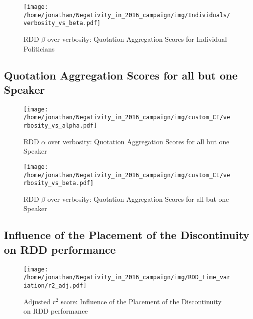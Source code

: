 \begin{figure}[h]\centering
	\texttt{[image: /home/jonathan/Negativity\_in\_2016\_campaign/img/Individuals/verbosity\_vs\_beta.pdf]}
	\caption{RDD $\beta$ over verbosity: Quotation Aggregation Scores for Individual Politicians}
	\label{fig: individuals_RDD beta over verbosity}
\end{figure}

\clearpage
\pagebreak

\subsection{Quotation Aggregation Scores for all but one Speaker}

\begin{figure}[h]\centering
	\texttt{[image: /home/jonathan/Negativity\_in\_2016\_campaign/img/custom\_CI/verbosity\_vs\_alpha.pdf]}
	\caption{RDD $\alpha$ over verbosity: Quotation Aggregation Scores for all but one Speaker}
	\label{fig: ablation_RDD alpha over verbosity}
\end{figure}

\begin{figure}[h]\centering
	\texttt{[image: /home/jonathan/Negativity\_in\_2016\_campaign/img/custom\_CI/verbosity\_vs\_beta.pdf]}
	\caption{RDD $\beta$ over verbosity: Quotation Aggregation Scores for all but one Speaker}
	\label{fig: ablation_RDD beta over verbosity}
\end{figure}

\clearpage
\pagebreak

\subsection{Influence of the Placement of the Discontinuity on RDD performance}

\begin{figure}[h]\centering
	\texttt{[image: /home/jonathan/Negativity\_in\_2016\_campaign/img/RDD\_time\_variation/r2\_adj.pdf]}
	\caption{Adjusted $r^2$ score: Influence of the Placement of the Discontinuity on RDD performance}
	\label{fig: rddtv_Adjusted r^2 score}
\end{figure}

\clearpage
\pagebreak

